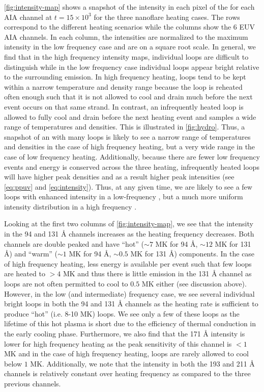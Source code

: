 \autoref{fig:intensity-map} shows a snapshot of the intensity in each pixel of the \AR{} for each AIA channel at $t=15\times10^3$ for the three nanoflare heating cases. The rows correspond to the different heating scenarios while the columns show the 6 EUV AIA channels. In each column, the intensities are normalized to the maximum intensity in the low frequency case and are on a square root scale. In general, we find that in the high frequency intensity maps, individual loops are difficult to distinguish while in the low frequency case individual loops appear bright relative to the surrounding emission. In high frequency heating, loops tend to be kept within a narrow temperature and density range because the loop is reheated often enough such that it is not allowed to cool and drain much before the next event occurs on that same strand. In contrast, an infrequently heated loop is allowed to fully cool and drain before the next heating event and samples a wide range of temperatures and densities. This is illustrated in \autoref{fig:hydro}. Thus, a snapshot of an \AR{} with many loops is likely to see a narrow range of temperatures and densities in the case of high frequency heating, but a very wide range in the case of low frequency heating. Additionally, because there are fewer low frequency events and energy is conserved across the three heating, infrequently heated loops will have higher peak densities and as a result higher peak intensities (see \autoref{eq:ppuv} and \ref{eq:intensity}). Thus, at any given time, we are likely to see a few loops with enhanced intensity in a low-frequency \AR{}, but a much more uniform intensity distribution in a high frequency \AR{}.

Looking at the first two columns of \autoref{fig:intensity-map}, we see that the intensity in the 94 and 131 \AA{} channels increases as the heating frequency decreases. Both channels are double peaked and have ``hot'' ($\sim7$ MK for 94 \AA{}, $\sim12$ MK for 131 \AA{}) and ``warm'' ($\sim1$ MK for 94 \AA{}, $\sim0.5$ MK for 131 \AA{}) components. In the case of high frequency heating, less energy is available per event such that few loops are heated to $>4$ MK and thus there is little emission in the 131 \AA{} channel as loops are not often permitted to cool to $0.5$ MK either (see discussion above). However, in the low (and intermediate) frequency case, we see several individual bright loops in both the 94 and 131 \AA{} channels as the heating rate is sufficient to produce ``hot'' (i.e. 8-10 MK) loops. We see only a few of these loops as the lifetime of this hot plasma is short due to the efficiency of thermal conduction in the early cooling phase. Furthermore, we also find that the 171 \AA{} intensity is lower for high frequency heating as the peak sensitivity of this channel is $<1$ MK and in the case of high frequency heating, loops are rarely allowed to cool below $1$ MK. Additionally, we note that the intensity in both the 193 and 211 \AA{} channels is relatively constant over heating frequency as compared to the three previous channels.  

